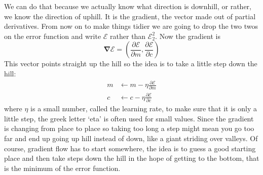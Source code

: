 \documentclass[12pt]{article}
\begin{document}
We can do that because we actually know what direction is downhill, or
rather, we know the direction of uphill. It is the gradient, the
vector made out of partial derivatives. From now on to make things tidier we are going to drop the two twos on the error function and write $\mathcal{E}$ rather than $\mathcal{E}_2^2$. Now the gradient is
\begin{equation}
  \boldsymbol{\nabla} \mathcal{E}=\left(\frac{\partial\mathcal{E}}{\partial m},\frac{\partial\mathcal{E}}{\partial c}\right)
\end{equation}
This vector points straight up the hill so the idea is to take a little step down the hill:
\begin{align}
  m&\leftarrow m-\eta\frac{\partial\mathcal{E}}{\partial m}\\
  c&\leftarrow c-\eta\frac{\partial\mathcal{E}}{\partial c}
\end{align}
where $\eta$ is a small number, called the learning rate, to make sure
that it is only a little step, the greek letter `eta' is often used
for small values. Since the gradient is changing from place to place
so taking too long a step might mean you go too far and end up going
up hill instead of down, like a giant striding over valleys. Of
course, gradient flow has to start somewhere, the idea is to guess a
good starting place and then take steps down the hill in the hope of
getting to the bottom, that is the minimum of the error function.
\end{document}
